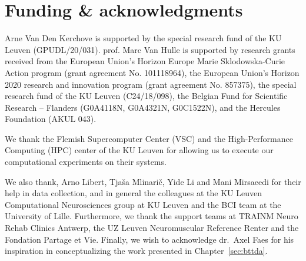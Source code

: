 \chapter*{Funding \& acknowledgments}

Arne Van Den Kerchove is supported by the special research fund of the KU Leuven
(GPUDL/20/031).
prof. Marc Van Hulle is supported by research grants received from
the European Union’s Horizon Europe Marie Sklodowska-Curie Action program
(grant agreement No. 101118964), the European Union’s Horizon 2020 research and
innovation program (grant agreement No. 857375), the special research fund of
the KU Leuven (C24/18/098), the Belgian Fund for Scientific Research – Flanders
(G0A4118N, G0A4321N, G0C1522N), and the Hercules
Foundation (AKUL 043).

We thank the Flemish Supercomputer Center (VSC) and the High-Performance
Computing (HPC) center of the KU Leuven for allowing us to execute our
computational experiments on their systems.

We also thank,  Arno Libert,
Tjaša Mlinarič, Yide Li and Mani Mirsaeedi for their help in data collection,
and in general the colleagues at the KU Leuven Computational Neurosciences
group at KU Leuven and the BCI team at the University of Lille.
Furthermore, we thank the support teams at TRAINM Neuro Rehab Clinics Antwerp,
the UZ Leuven Neuromuscular Reference Renter and the Fondation Partage et Vie.
Finally, we wish to acknowledge dr.\ Axel Faes for his inspiration in conceptualizing
the work presented in Chapter~\ref{sec:bttda}.

